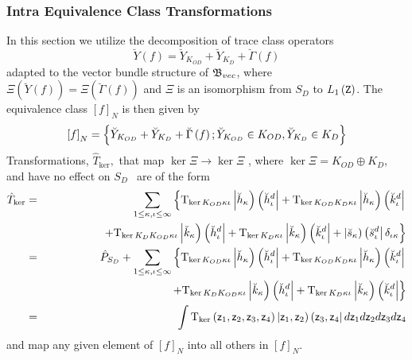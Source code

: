 \subsubsection{Intra Equivalence Class Transformations}

In this section we utilize the decomposition of trace class operators 
\begin{equation}
\breve{Y}\left( f\right) =\breve{Y}_{K_{OD}}+\breve{Y}_{K_{D}}+\breve{\Gamma}%
\left( f\right)
\end{equation}%
adapted to the vector bundle structure of ${\frak B}_{vec}$, where $\Xi
\left( \breve{Y}\left( f\right) \right) =\Xi \left( \breve{\Gamma}\left(
f\right) \right) $ and $\Xi $ is an isomorphism from $S_{D}$ to $L_{1}\left( 
{\tt Z}\right) $. The equivalence class $\left[ f\right] _{N}$ is then given
by 
\begin{equation}
\left[ f\right] _{N}=\left\{ \breve{Y}_{K_{OD}}+\breve{Y}_{K_{D}}+\breve{%
\Gamma}\left( f\right) ;\breve{Y}_{K_{OD}}\in K_{OD},\breve{Y}_{K_{D}}\in
K_{D}\right\}
\end{equation}%
Transformations, $\hat{T}_{\ker },$ that map $\ker \Xi \rightarrow \ker \Xi $%
, where $\ker \Xi =K_{OD}\oplus K_{D}$, and have no effect on $S_{D\text{ }}$
are of the form 
\begin{eqnarray}
\hat{T}_{\ker } &=&\sum_{1\leq \kappa ,\iota \leq \infty }\left\{ {\rm T}%
_{\ker K_{OD}\kappa \iota }\left| \breve{h}_{\kappa }\right) \left( \breve{h}%
_{\iota }^{d}\right| +{\rm T}_{\ker K_{OD}K_{D}\kappa \iota }\left| \breve{h}%
_{\kappa }\right) \left( \breve{k}_{\iota }^{d}\right| \right.  \nonumber \\
&&\qquad \qquad \quad \left. +{\rm T}_{\ker K_{D}K_{OD}\kappa \iota }\left| 
\breve{k}_{\kappa }\right) \left( \breve{h}_{\iota }^{d}\right| +{\rm T}%
_{\ker K_{D}\kappa \iota }\left| \breve{k}_{\kappa }\right) \left( \breve{k}%
_{\iota }^{d}\right| +\left| \breve{s}_{\kappa }\right) \left( \breve{s}%
_{\iota }^{d}\right| \delta _{\iota \kappa }\right\} \\
&=&\hat{P}_{S_{D}}+\sum_{1\leq \kappa ,\iota \leq \infty }\left\{ {\rm T}%
_{\ker K_{OD}\kappa \iota }\left| \breve{h}_{\kappa }\right) \left( \breve{h}%
_{\iota }^{d}\right| +{\rm T}_{\ker K_{OD}K_{D}\kappa \iota }\left| \breve{h}%
_{\kappa }\right) \left( \breve{k}_{\iota }^{d}\right| \right.  \nonumber \\
&&\qquad \qquad \qquad \qquad \qquad \left. \,+{\rm T}_{\ker
K_{D}K_{OD}\kappa \iota }\left| \breve{k}_{\kappa }\right) \left( \breve{h}%
_{\iota }^{d}\right| +{\rm T}_{\ker K_{D}\kappa \iota }\left| \breve{k}%
_{\kappa }\right) \left( \breve{k}_{\iota }^{d}\right| \right\} \\
&=&\int {\rm T}_{\ker }\left( {\sf z}_{1},{\sf z}_{2},{\sf z}_{3},{\sf z}%
_{4}\right) |{\sf z}_{1},{\sf z}_{2}{\bf )}\left( {\sf z}_{3},{\sf z}%
_{4}\right| d{\sf z}_{1}d{\sf z}_{2}d{\sf z}_{3}d{\sf z}_{4}
\end{eqnarray}%
and map any given element of $\left[ f\right] _{N}$ into all others in $%
\left[ f\right] _{N}$.

